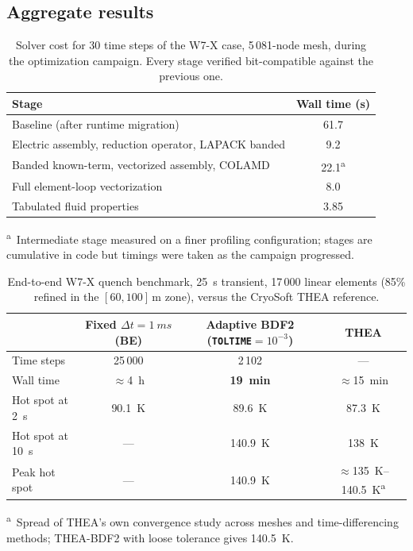 \documentclass[11pt,a4paper]{article}
\newcommand{\code}[1]{\texttt{#1}}
\begin{document}
\subsection{Aggregate results}

\begin{table}[ht]
  \centering
  \caption{Solver cost for 30 time steps of the W7-X case, 5\,081-node mesh,
           during the optimization campaign. Every stage verified bit-compatible
           against the previous one.}
  \label{tab:perf30}
  \begin{tabular}{lS[table-format=2.1]}
    \toprule
    Stage & {Wall time (\si{s})} \\
    \midrule
    Baseline (after runtime migration)                      & 61.7 \\
    Electric assembly, reduction operator, LAPACK banded    &  9.2 \\
    Banded known-term, vectorized assembly, COLAMD          & 22.1\textsuperscript{a} \\
    Full element-loop vectorization                          &  8.0 \\
    Tabulated fluid properties                               &  3.85 \\
    \bottomrule
  \end{tabular}

  \vspace{2pt}
  {\footnotesize \textsuperscript{a}~Intermediate stage measured on a finer
  profiling configuration; stages are cumulative in code but timings were taken as
  the campaign progressed.}
\end{table}

\begin{table}[ht]
  \centering
  \caption{End-to-end W7-X quench benchmark, \SI{25}{s} transient, 17\,000 linear
           elements (85\% refined in the $[60,100]$\,\si{m} zone), versus the
           CryoSoft THEA reference.}
  \label{tab:endtoend}
  \begin{tabular}{lccc}
    \toprule
     & Fixed $\Delta t = \SI{1}{ms}$ (BE) & Adaptive BDF2 (\code{TOLTIME}$=10^{-3}$) & THEA \\
    \midrule
    Time steps          & 25\,000            & 2\,102   & --- \\
    Wall time           & $\approx$\SI{4}{h} & \textbf{\SI{19}{min}} & $\approx$\SI{15}{min} \\
    Hot spot at \SI{2}{s}  & \SI{90.1}{K}    & \SI{89.6}{K}  & \SI{87.3}{K} \\
    Hot spot at \SI{10}{s} & ---              & \SI{140.9}{K} & \SI{138}{K} \\
    Peak hot spot          & ---              & \SI{140.9}{K} & $\approx$\SIrange{135}{140.5}{K}\textsuperscript{a} \\
    \bottomrule
  \end{tabular}

  \vspace{2pt}
  {\footnotesize \textsuperscript{a}~Spread of THEA's own convergence study across
  meshes and time-differencing methods; THEA-BDF2 with loose tolerance gives
  \SI{140.5}{K}.}
\end{table}
\end{document}
